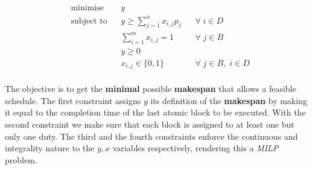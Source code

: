 \vspace{\baselineskip}
\begin{equation}
\label{equation: Makespan Scheduling}
\begin{aligned}
&\text{minimise}
& & y  \\ 
& \text{subject to}
& & y \geq \sum _{j=1}^n x_{i,j}p_{j}  \;\;\; &\forall \; i \in D\\   
& & &\sum _{i=1}^m x_{i,j} = 1 \;\;\; &\forall \; j \in B\\
& & & y\geq 0  \\
& & & x_{i,j} \in  \{ 0,1 \} \;\;\; &\forall \; j \in B, \; i \in D\\
\end{aligned}
\end{equation}

\vspace{\baselineskip}
\noindent
The objective is to get the \textbf{minimal} possible \textbf{makespan} that allows a feasible schedule. The first constraint assigns $y$ its definition of the \textbf{makespan} by making it equal to the completion time of the last atomic block to be executed. With the second constraint we make sure that each block is assigned to at least one but only one duty. The third and the fourth constraints enforce the continuous and integrality nature to the $y,x$ variables respectively, rendering this a \textit{MILP} problem.


